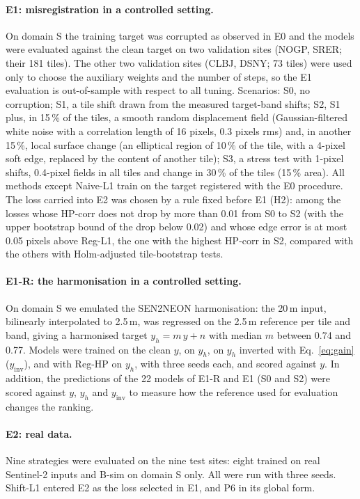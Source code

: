 \documentclass[pdflatex,sn-basic,referee,lineno]{sn-jnl}
\begin{document}
\paragraph{E1: misregistration in a controlled setting.} On domain S the training target was corrupted as observed
in E0 and the models were evaluated against the clean target on two validation sites (NOGP, SRER; their 181
tiles). The other two validation sites (CLBJ, DSNY; 73 tiles) were used only to choose the auxiliary weights and the
number of steps, so the E1 evaluation is out-of-sample with respect to all tuning.
Scenarios: S0, no corruption; S1, a tile shift drawn from the measured target-band shifts; S2, S1 plus, in 15\,\%
of the tiles, a smooth random displacement field (Gaussian-filtered white noise with a correlation length of 16
pixels, 0.3 pixels rms) and, in another 15\,\%, local surface change (an elliptical region of 10\,\% of the tile,
with a 4-pixel soft edge, replaced by the content of another tile); S3, a stress test with 1-pixel shifts, 0.4-pixel
fields in all tiles and change in 30\,\% of the tiles (15\,\% area). All methods except Naive-L1 train on the
target registered with the E0 procedure. The loss carried into E2 was chosen by a rule fixed before E1 (H2): among
the losses whose HP-corr does not drop by more than 0.01 from S0 to S2 (with the upper bootstrap bound of the drop
below 0.02) and whose edge error is at most 0.05 pixels
above Reg-L1, the one with the highest HP-corr in S2, compared with the others with Holm-adjusted tile-bootstrap
tests.

\paragraph{E1-R: the harmonisation in a controlled setting.} On domain S we emulated the SEN2NEON harmonisation:
the 20\,m input, bilinearly interpolated to 2.5\,m, was regressed on the 2.5\,m reference per tile and band, giving
a harmonised target $y_h = m\,y + n$ with median $m$ between 0.74 and 0.77. Models were trained on the clean $y$, on
$y_h$, on $y_h$ inverted with Eq.~\eqref{eq:gain} ($y_{\mathrm{inv}}$), and with Reg-HP on $y_h$, with three seeds
each, and scored against $y$. In addition, the predictions of the 22 models of E1-R and E1 (S0 and S2) were scored
against $y$, $y_h$ and $y_{\mathrm{inv}}$ to measure how the reference used for evaluation changes the ranking.

\paragraph{E2: real data.} Nine strategies were evaluated on the nine test sites: eight trained on real Sentinel-2
inputs and B-sim on domain S only. All were run with three seeds. Shift-L1 entered E2 as the loss selected in E1,
and P6 in its global form.
\end{document}
